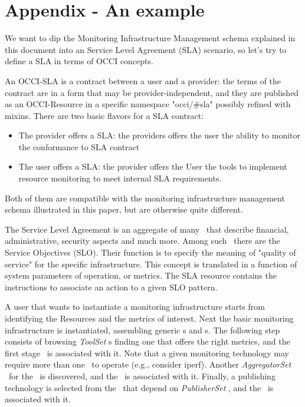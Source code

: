 \documentclass[12pt]{article}  %
\begin{document}
\appendix

\section*{Appendix - An example}

We want to dip the Monitoring Infrastructure Management schema explained in this document into an Service Level Agreement (SLA) scenario, so let's try to define a SLA in terms of OCCI concepts.

An OCCI-SLA is a contract between a user and a provider: the terms of the contract are in a form that may be provider-independent, and they are published as an OCCI-Resource in a specific namespace "occi/\#sla" possibly refined with mixins. There are two basic flavors for a SLA contract:

\begin{itemize} 
\item The provider offers a SLA: the providers offers the user the ability to monitor the conformance to SLA contract
\item The user offers a SLA: the provider offers the User the tools to implement resource monitoring to meet internal SLA requirements.
\end{itemize}

Both of them are compatible with the monitoring infrastructure management schema illustrated in this paper, but are otherwise quite different.

The Service Level Agreement is an aggregate of many \rs\, that describe financial, administrative, security aspects and much more. Among such \rs\, there are the Service  Objectives (SLO). Their function is to specify the meaning of "quality of service" for the specific infrastructure. This concept is translated in a function of system parameters of operation, or metrics.
 The SLA resource contains the instructions to associate an action to a given SLO pattern.

A user that wants to instantiate a monitoring infrastructure starts from identifying the Resources and the metrics of interest. Next the basic monitoring infrastructure is instantiated, assembling generic \sens s and \coll s. The following step consists of browsing {\em ToolSet} \mi s finding one that offers the right metrics, and the first stage \coll\ is associated with it. Note that a given monitoring technology may require more than one \coll\ to operate (e.g., consider iperf). Another {\em AggregatorSet} \mi\ for the \sens\ is discovered, and the \sens\ is associated with it. Finally, a publishing technology is selected from the \mi\ that depend on {\em PublisherSet} \mi , and the \sens\ is associated with it.
\end{document}
